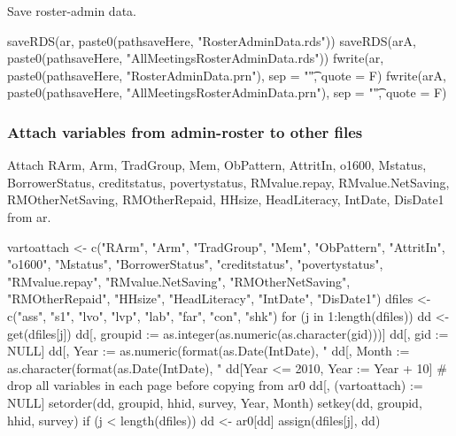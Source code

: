 
Save roster-admin data.
\begin{Schunk}
\begin{Sinput}
saveRDS(ar, paste0(pathsaveHere, "RosterAdminData.rds"))
saveRDS(arA, paste0(pathsaveHere, "AllMeetingsRosterAdminData.rds"))
fwrite(ar, paste0(pathsaveHere, "RosterAdminData.prn"), sep = "\t", quote = F)
fwrite(arA, paste0(pathsaveHere, "AllMeetingsRosterAdminData.prn"), sep = "\t", quote = F)
\end{Sinput}
\end{Schunk}












\subsubsection{Attach variables from admin-roster to other files}


Attach \textsf{RArm, Arm, TradGroup, Mem, ObPattern, AttritIn, o1600, Mstatus, BorrowerStatus, creditstatus, povertystatus, RMvalue.repay, RMvalue.NetSaving, RMOtherNetSaving, RMOtherRepaid, HHsize, HeadLiteracy, IntDate, DisDate1} from \textsf{ar}.

\begin{Schunk}
\begin{Sinput}
vartoattach <- c("RArm", "Arm", "TradGroup", "Mem", 
  "ObPattern", "AttritIn", "o1600", "Mstatus", "BorrowerStatus", 
  "creditstatus", "povertystatus", "RMvalue.repay", 
  "RMvalue.NetSaving", "RMOtherNetSaving", "RMOtherRepaid",
  "HHsize", "HeadLiteracy", "IntDate", "DisDate1")
dfiles <- c("ass", "s1", "lvo", "lvp", "lab", "far", "con", "shk")
for (j in 1:length(dfiles)) {
  dd <- get(dfiles[j])
  dd[, groupid := as.integer(as.numeric(as.character(gid)))]
  dd[, gid := NULL]
  dd[, Year :=  as.numeric(format(as.Date(IntDate), "%Y"))]
  dd[, Month := as.character(format(as.Date(IntDate), "%B"))]
  dd[Year <= 2010, Year := Year + 10]
  # drop all variables in each page before copying from ar0
  dd[, (vartoattach) := NULL]
  setorder(dd, groupid, hhid, survey, Year, Month)
  setkey(dd, groupid, hhid, survey)
  if (j < length(dfiles)) dd <- ar0[dd]
  assign(dfiles[j], dd)
}
\end{Sinput}
\end{Schunk}

